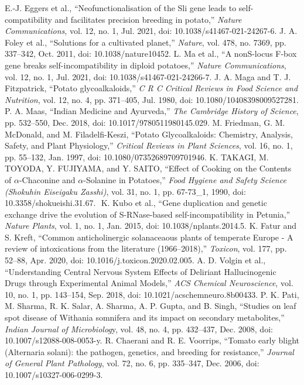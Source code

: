 \documentclass[conference]{IEEEtran}
\begin{document}
\begin{thebibliography}{00}
 E.-J. Eggers et al., “Neofunctionalisation of the Sli gene leads to self-compatibility and facilitates precision breeding in potato,” \textit{Nature Communications}, vol. 12, no. 1, Jul. 2021, doi: 10.1038/s41467-021-24267-6.
 J. A. Foley et al., “Solutions for a cultivated planet,” \textit{Nature}, vol. 478, no. 7369, pp. 337–342, Oct. 2011, doi: 10.1038/nature10452.
 L. Ma et al., “A nonS-locus F-box gene breaks self-incompatibility in diploid potatoes,” \textit{Nature Communications}, vol. 12, no. 1, Jul. 2021, doi: 10.1038/s41467-021-24266-7.
 J. A. Maga and T. J. Fitzpatrick, “Potato glycoalkaloids,” \textit{C R C Critical Reviews in Food Science and Nutrition}, vol. 12, no. 4, pp. 371–405, Jul. 1980, doi: 10.1080/10408398009527281.
 P. A. Maas, “Indian Medicine and Ayurveda,” \textit{The Cambridge History of Science}, pp. 532–550, Dec. 2018, doi: 10.1017/9780511980145.029.
 M. Friedman, G. M. McDonald, and M. Filadelfi-Keszi, “Potato Glycoalkaloids: Chemistry, Analysis, Safety, and Plant Physiology,” \textit{Critical Reviews in Plant Sciences}, vol. 16, no. 1, pp. 55–132, Jan. 1997, doi: 10.1080/07352689709701946.
 K. TAKAGI, M. TOYODA, Y. FUJIYAMA, and Y. SAITO, “Effect of Cooking on the Contents of $\alpha$-Chaconine and $\alpha$-Solanine in Potatoes,” \textit{Food Hygiene and Safety Science (Shokuhin Eiseigaku Zasshi)}, vol. 31, no. 1, pp. 67-73\_1, 1990, doi: 10.3358/shokueishi.31.67.
‌ K. Kubo et al., “Gene duplication and genetic exchange drive the evolution of S-RNase-based self-incompatibility in Petunia,” \textit{Nature Plants}, vol. 1, no. 1, Jan. 2015, doi: 10.1038/nplants.2014.5.
 K. Fatur and S. Kreft, “Common anticholinergic solanaceaous plants of temperate Europe - A review of intoxications from the literature (1966–2018),” \textit{Toxicon}, vol. 177, pp. 52–88, Apr. 2020, doi: 10.1016/j.toxicon.2020.02.005.
 A. D. Volgin et al., “Understanding Central Nervous System Effects of Deliriant Hallucinogenic Drugs through Experimental Animal Models,” \textit{ACS Chemical Neuroscience}, vol. 10, no. 1, pp. 143–154, Sep. 2018, doi: 10.1021/acschemneuro.8b00433.
 P. K. Pati, M. Sharma, R. K. Salar, A. Sharma, A. P. Gupta, and B. Singh, “Studies on leaf spot disease of Withania somnifera and its impact on secondary metabolites,” \textit{Indian Journal of Microbiolog}y, vol. 48, no. 4, pp. 432–437, Dec. 2008, doi: 10.1007/s12088-008-0053-y.
 R. Chaerani and R. E. Voorrips, “Tomato early blight (Alternaria solani): the pathogen, genetics, and breeding for resistance,” \textit{Journal of General Plant Pathology}, vol. 72, no. 6, pp. 335–347, Dec. 2006, doi: 10.1007/s10327-006-0299-3.

\end{thebibliography}
\end{document}
